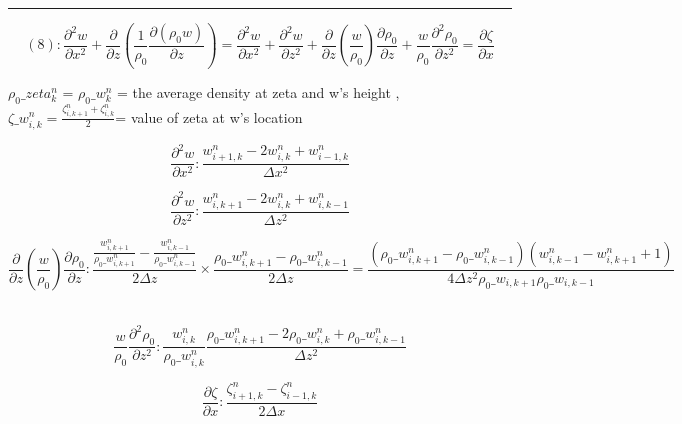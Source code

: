 \documentclass[a4paper,fleqn,10pt]{report}
\begin{document}
\begin{CJK*}{UTF8}{bsmi}
\rule{16.5cm}{1pt}

\begin{equation*}
(8): \frac{\partial^2 w}{\partial x^{2}} + \frac{\partial}{\partial z}(\frac{1}{\rho_{0}}\frac{\partial (\rho_{0}w)}{\partial z}) = \frac{\partial^2 w}{\partial x^{2}} + \frac{\partial^2 w}{\partial z^{2}} + \frac{\partial}{\partial z}(\frac{w}{\rho_{0}})\frac{\partial \rho_{0}}{\partial z} + \frac{w}{\rho_{0}}\frac{\partial^2 \rho_{0}}{\partial z^{2}} = \frac{\partial \zeta}{\partial x}
\end{equation*}

\quad $\rho_{0}\_zeta^{n}_{k}$ = $\rho_{0}\_w^{n}_{k}$ = the average density at zeta and w's height ,\\

\quad $\zeta\_w^{n}_{i,k} = \frac{\zeta^{n}_{i,k+1} + \zeta^{n}_{i,k}}{2}$= value of zeta at w's location

\begin{equation*}
\frac{\partial^2 w}{\partial x^{2}}: \frac{w^{n}_{i+1,k} - 2w^{n}_{i,k} + w^{n}_{i-1,k}}{\Delta x^{2}}
\end{equation*}

\begin{equation*}
\frac{\partial^2 w}{\partial z^{2}}: \frac{w^{n}_{i,k+1} - 2w^{n}_{i,k} + w^{n}_{i,k-1}}{\Delta z^{2}}
\end{equation*}

\begin{equation*}
\frac{\partial}{\partial z}(\frac{w}{\rho_{0}})\frac{\partial \rho_{0}}{\partial z}: \frac{\frac{w^{n}_{i,k+1}}{\rho_{0}\_w^{n}_{i,k+1}} - \frac{w^{n}_{i,k-1}}{\rho_{0}\_w^{n}_{i,k-1}}}{2\Delta z} \times \frac{\rho_{0}\_w^{n}_{i,k+1} - \rho_{0}\_w^{n}_{i,k-1}}{2\Delta z} = \frac{(\rho_{0}\_w^{n}_{i,k+1} - \rho_{0}\_w^{n}_{i,k-1})(w^{n}_{i,k-1} - w^{n}_{i,k+1} + 1) }{4\Delta z^2 \rho_0\_w_{i,k+1}\rho_0\_w_{i,k-1}}
\end{equation*}\\
\newpage

\begin{equation*}
\frac{w}{\rho_{0}}\frac{\partial^2 \rho_{0}}{\partial z^{2}}: \frac{w^{n}_{i,k}}{\rho_{0}\_w^{n}_{i,k}}\frac{\rho_{0}\_w^{n}_{i,k+1} - 2\rho_{0}\_w^{n}_{i,k} + \rho_{0}\_w^{n}_{i,k-1}}{\Delta z^2}
\end{equation*}

\begin{equation*}
\frac{\partial \zeta}{\partial x}: \frac{\zeta^{n}_{i+1,k} - \zeta^{n}_{i-1,k}}{2\Delta x}
\end{equation*}


\end{CJK*}
\end{document}
